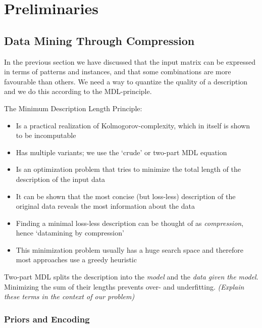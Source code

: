 \documentclass[a4paper,notoc,oneside]{tufte-book}
\begin{document}
\chapter{Preliminaries}

\section{Data Mining Through Compression}

In the previous section we have discussed that the input matrix can be expressed in terms of patterns and instances, and that some combinations are more favourable than others. We need a way to quantize the quality of a description and we do this according to the MDL-principle. 

The Minimum Description Length Principle:
\begin{itemize}
\item Is a practical realization of Kolmogorov-complexity, which in itself is shown to be incomputable
\item Has multiple variants; we use the `crude' or two-part MDL equation
\item Is an optimization problem that tries to minimize the total length of the description of the input data
\item It can be shown that the most concise (but loss-less) description of the original data reveals the most information about the data
\item Finding a minimal loss-less description can be thought of as \emph{compression}, hence `datamining by compression'
\item This minimization problem usually has a huge search space and therefore most approaches use a greedy heuristic
\end{itemize}

Two-part MDL splits the description into the \emph{model} and the \emph{data given the model}. Minimizing the sum of their lengths prevents over- and underfitting. \emph{(Explain these terms in the context of our problem)}

\subsection{Priors and Encoding}
\end{document}
